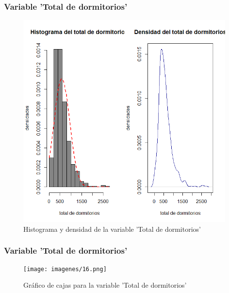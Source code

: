 \documentclass[12pt]{beamer}
\begin{document}
\begin{frame}
\frametitle{Variable 'Total de dormitorios'}
\begin{figure}[!h]
    \begin{center}
        \includegraphics[width=11cm]{imagenes/5.png}
        \caption{Histograma y densidad de la variable 'Total de dormitorios'}
        \label{fig:Densidad}
    \end{center}
\end{figure}
\end{frame}
\begin{frame}
\frametitle{Variable 'Total de dormitorios'}
\begin{figure}[!h]
    \begin{center}
        \texttt{[image: imagenes/16.png]}
        \caption{Gráfico de cajas para la variable 'Total de dormitorios'}
        \label{fig:Densidad}
    \end{center}
\end{figure}
\end{frame}
\end{document}
